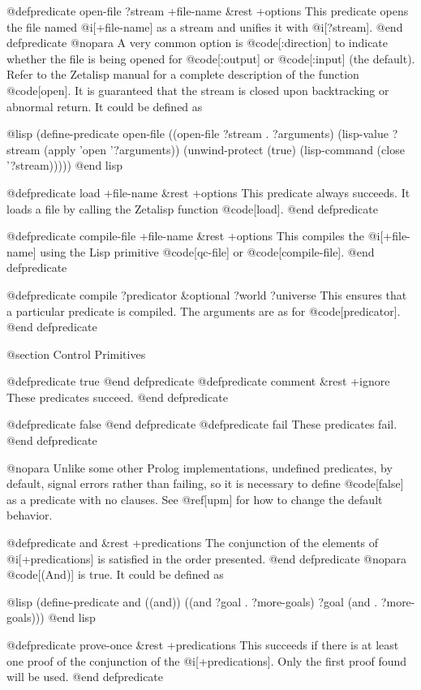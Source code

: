 {@defpredicate open-file ?stream +file-name &rest +options
This predicate opens the file named @i[+file-name] as a stream and unifies
it with @i[?stream].
@end defpredicate
@nopara
A very common option is @code[:direction] to indicate whether the file
is being opened for @code[:output] or @code[:input] (the default).
Refer to the Zetalisp manual for a complete description of the function
@code[open].
It is guaranteed that the stream is closed upon
backtracking or abnormal return.
It could be defined as

@lisp
(define-predicate open-file
  ((open-file ?stream . ?arguments)
   (lisp-value ?stream (apply 'open '?arguments))
   (unwind-protect (true) (lisp-command (close '?stream)))))
@end lisp

@defpredicate load +file-name &rest +options
This predicate always succeeds.
It loads a file by calling the Zetalisp function @code[load].
@end defpredicate

@defpredicate compile-file +file-name &rest +options
This compiles the @i[+file-name] using the Lisp primitive 
@code[qc-file] or @code[compile-file].
@end defpredicate

@defpredicate compile ?predicator &optional ?world ?universe
This ensures that a particular predicate is compiled.
The arguments are as for @code[predicator].
@end defpredicate


@section Control Primitives

@defpredicate true
@end defpredicate
@defpredicate comment &rest +ignore
These predicates succeed.
@end defpredicate

@defpredicate false
@end defpredicate
@defpredicate fail
These predicates fail.
@end defpredicate

@nopara
Unlike some other Prolog implementations, undefined predicates, by default,
signal errors rather than failing, so it is necessary to define @code[false] as
a predicate with no clauses.  See @ref[upm] for how to change the default
behavior.

@defpredicate and &rest +predications
The conjunction of the elements of
@i[+predications] is satisfied in the order presented.
@end defpredicate
@nopara
@code[(And)] is true.  It could be defined as

@lisp
(define-predicate and
  ((and))
  ((and ?goal . ?more-goals)
   ?goal
   (and . ?more-goals)))
@end lisp

@defpredicate prove-once &rest +predications
This succeeds if there is at least one proof of the conjunction of the
@i[+predications].
Only the first proof found will be used.
@end defpredicate

}
